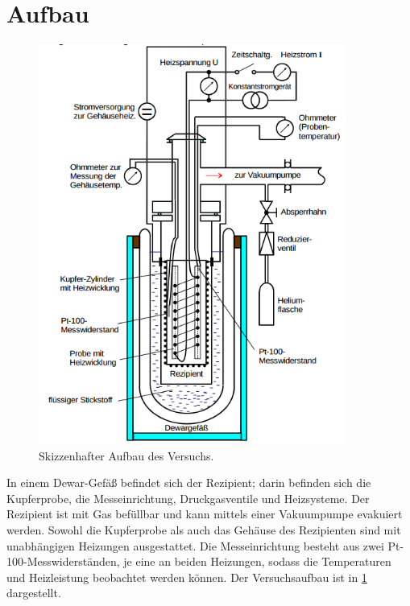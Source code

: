 \section{Aufbau}
\begin{figure}
	\centering
	\includegraphics[width=0.9\textwidth,]{graphics/aufbau.png}
	\caption{Skizzenhafter Aufbau des Versuchs. \cite{skript}}
	\label{fig:aufbau}
\end{figure}
In einem Dewar-Gefäß befindet sich der Rezipient; 
darin befinden sich die Kupferprobe, die Messeinrichtung, Druckgasventile und Heizsysteme.
Der Rezipient ist mit Gas befüllbar und kann mittels einer Vakuumpumpe evakuiert werden. 
Sowohl die Kupferprobe als auch das Gehäuse des Rezipienten sind mit unabhängigen Heizungen ausgestattet.
Die Messeinrichtung besteht aus zwei Pt-100-Messwiderständen, 
je eine an beiden Heizungen, 
sodass die Temperaturen und Heizleistung beobachtet werden können.
Der Versuchsaufbau ist in \ref{fig:aufbau} dargestellt.


